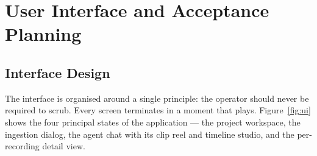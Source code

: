 \section{User Interface and Acceptance Planning}

\subsection{Interface Design}

The interface is organised around a single principle: the operator should never be
required to scrub. Every screen terminates in a moment that plays.
Figure~\ref{fig:ui} shows the four principal states of the application --- the project workspace, the ingestion
dialog, the agent chat with its clip reel and timeline studio, and the per-recording
detail view.


